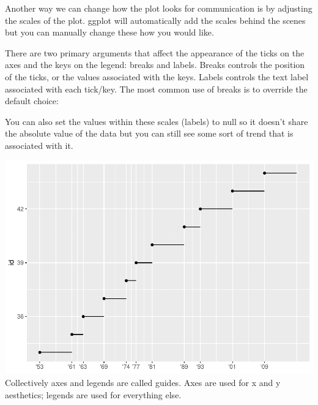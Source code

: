 \documentclass[
]{article}
\newenvironment{Shaded}{\begin{snugshade}}{\end{snugshade}}
\newcommand{\AttributeTok}[1]{\textcolor[rgb]{0.77,0.63,0.00}{#1}}
\newcommand{\ConstantTok}[1]{\textcolor[rgb]{0.00,0.00,0.00}{#1}}
\newcommand{\DecValTok}[1]{\textcolor[rgb]{0.00,0.00,0.81}{#1}}
\newcommand{\FunctionTok}[1]{\textcolor[rgb]{0.00,0.00,0.00}{#1}}
\newcommand{\NormalTok}[1]{#1}
\newcommand{\SpecialCharTok}[1]{\textcolor[rgb]{0.00,0.00,0.00}{#1}}
\newcommand{\StringTok}[1]{\textcolor[rgb]{0.31,0.60,0.02}{#1}}
\begin{document}
Another way we can change how the plot looks for communication is by
adjusting the scales of the plot. ggplot will automatically add the
scales behind the scenes but you can manually change these how you would
like.

There are two primary arguments that affect the appearance of the ticks
on the axes and the keys on the legend: breaks and labels. Breaks
controls the position of the ticks, or the values associated with the
keys. Labels controls the text label associated with each tick/key. The
most common use of breaks is to override the default choice:

You can also set the values within these scales (labels) to null so it
doesn't share the absolute value of the data but you can still see some
sort of trend that is associated with it.

\begin{Shaded}
\end{Shaded}

\includegraphics{Journal_files/figure-latex/unnamed-chunk-61-1.pdf}
Collectively axes and legends are called guides. Axes are used for x and
y aesthetics; legends are used for everything else.
\end{document}
